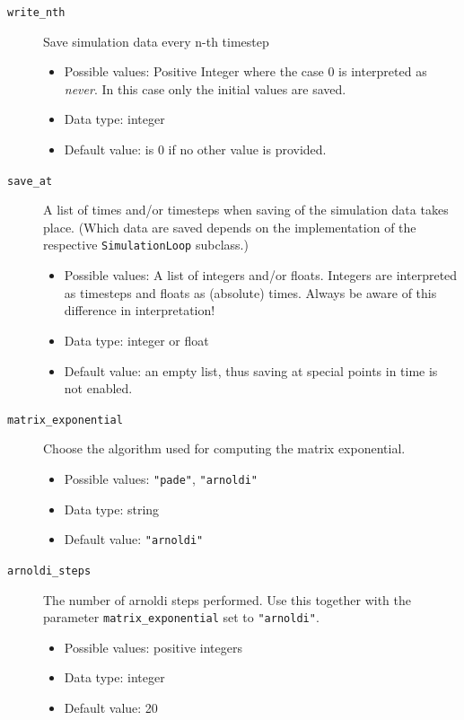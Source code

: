 \documentclass[a4paper,10pt]{report}
\begin{document}
\begin{description}
  \item[\texttt{write\_nth}] Save simulation data every n-th timestep
  \begin{itemize}
    \item Possible values: Positive Integer where the case 0 is interpreted as
          \emph{never}. In this case only the initial values are saved.
    \item Data type: integer
    \item Default value: is 0 if no other value is provided.
  \end{itemize}

  \item[\texttt{save\_at}] A list of times and/or timesteps when saving of the
    simulation data takes place. (Which data are saved depends on the implementation
    of the respective \texttt{SimulationLoop} subclass.)
  \begin{itemize}
    \item Possible values: A list of integers and/or floats. Integers are interpreted
    as timesteps and floats as (absolute) times. Always be aware of this difference
    in interpretation!
    \item Data type: integer or float
    \item Default value: an empty list, thus saving at special points in time
    is not enabled.
  \end{itemize}

  \item[\texttt{matrix\_exponential}] Choose the algorithm used for computing the matrix exponential.
  \begin{itemize}
    \item Possible values: \texttt{"pade"}, \texttt{"arnoldi"}
    \item Data type: string
    \item Default value: \texttt{"arnoldi"}
  \end{itemize}

  \item[\texttt{arnoldi\_steps}] The number of arnoldi steps performed. Use this together with
  the parameter \texttt{matrix\_exponential} set to \texttt{"arnoldi"}.
  \begin{itemize}
    \item Possible values: positive integers
    \item Data type: integer
    \item Default value: 20
  \end{itemize}
\end{description}
\end{document}
